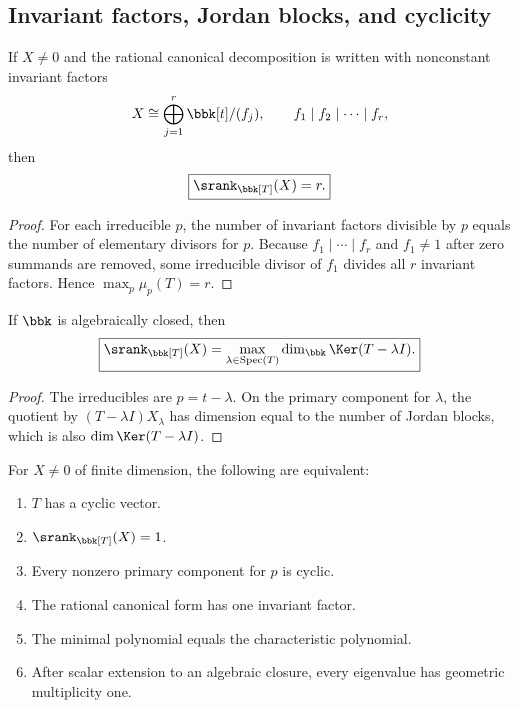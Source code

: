 \subsection{Invariant factors, Jordan blocks, and cyclicity}
\begin{corollary}
\label{cor:invariant-factor-count}
If $X\neq0$ and the rational canonical decomposition is written with nonconstant invariant factors
\[
X\cong\bigoplus_{j=1}^{r}\bbk[t]/(f_j),
\qquad
f_1\mid f_2\mid\cdots\mid f_r,
\]
then
\[
\boxed{\srank_{\bbk[T]}(X)=r.}
\]
\end{corollary}

\begin{proof}
For each irreducible $p$, the number of invariant factors divisible by $p$ equals the number of elementary divisors for $p$.  Because $f_1\mid\cdots\mid f_r$ and $f_1\neq1$ after zero summands are removed, some irreducible divisor of $f_1$ divides all $r$ invariant factors.  Hence $\max_p\mu_p(T)=r$.
\end{proof}

\begin{corollary}
\label{cor:geometric-multiplicity}
If $\bbk$ is algebraically closed, then
\[
\boxed{
\srank_{\bbk[T]}(X)
=
\max_{\lambda\in\operatorname{Spec}(T)}
\dim_{\bbk}\Ker(T-\lambda I).
}
\]
\end{corollary}

\begin{proof}
The irreducibles are $p=t-\lambda$.  On the primary component for $\lambda$, the quotient by $(T-\lambda I)X_\lambda$ has dimension equal to the number of Jordan blocks, which is also $\dim\Ker(T-\lambda I)$.
\end{proof}

\begin{corollary}
\label{cor:cyclic-matrix}
For $X\ne0$ of finite dimension, the following are equivalent:
\begin{enumerate}[label=(\roman*)]
\item $T$ has a cyclic vector.
\item $\srank_{\bbk[T]}(X)=1$.
\item Every nonzero primary component for $p$ is cyclic.
\item The rational canonical form has one invariant factor.
\item The minimal polynomial equals the characteristic polynomial.
\item After scalar extension to an algebraic closure, every eigenvalue has geometric multiplicity one.
\end{enumerate}
\end{corollary}

